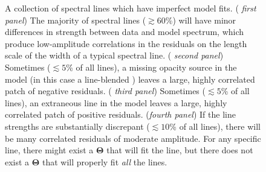 \documentclass[iop,floatfix]{emulateapj}
\newcommand{\vT}{ {\bm \Theta}}
\begin{document}
\begin{figure}[!htb]
\begin{center}
  \caption{A collection of spectral lines which have imperfect model fits.
    ( {\it first panel}) The majority of spectral lines ($\gtrsim 60$\%) will
    have minor differences in strength between data and model spectrum, which
    produce low-amplitude correlations in the residuals on the length scale of
    the width of a typical spectral line.  ( {\it second panel}) Sometimes
    ($\lesssim 5$\% of all lines), a missing opacity source in the model (in
    this case a line-blended ) leaves a large, highly correlated
    patch of negative residuals.  ( {\it third panel}) Sometimes ($\lesssim
    5$\% of all lines), an extraneous line in the model leaves a large, highly
    correlated patch of positive residuals. ({\it fourth panel}) If the line
    strengths are substantially discrepant ($\lesssim 10$\% of all lines),
    there will be many correlated residuals of moderate amplitude. For any specific line, there might
    exist a $\vT$ that will fit the line, but there does not exist a $\vT$ that
    will properly fit \emph{all} the lines.}
\label{fig:badlines}
\end{center}
\end{figure}
\end{document}
